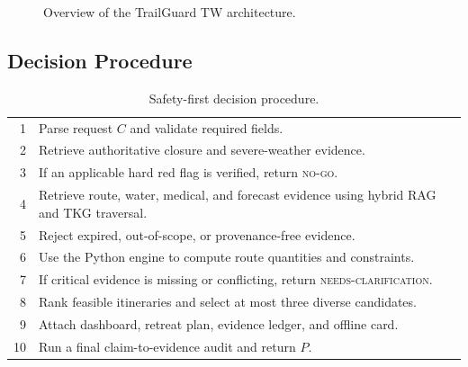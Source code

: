 \documentclass[conference]{IEEEtran}
\begin{document}
\begin{figure}[t]
    \centering
    \caption{Overview of the TrailGuard TW architecture.}
    \label{fig:architecture}
\end{figure}

\subsection{Decision Procedure}
\begin{table}[t]
\caption{Safety-first decision procedure.}
\label{tab:algorithm}
\centering
\small
\begin{tabular}{r p{}}
\toprule
1 & Parse request $C$ and validate required fields.\\
2 & Retrieve authoritative closure and severe-weather evidence.\\
3 & If an applicable hard red flag is verified, return \textsc{no-go}.\\
4 & Retrieve route, water, medical, and forecast evidence using hybrid RAG
and TKG traversal.\\
5 & Reject expired, out-of-scope, or provenance-free evidence.\\
6 & Use the Python engine to compute route quantities and constraints.\\
7 & If critical evidence is missing or conflicting, return
\textsc{needs-clarification}.\\
8 & Rank feasible itineraries and select at most three diverse candidates.\\
9 & Attach dashboard, retreat plan, evidence ledger, and offline card.\\
10 & Run a final claim-to-evidence audit and return $P$.\\
\bottomrule
\end{tabular}
\end{table}
\end{document}
